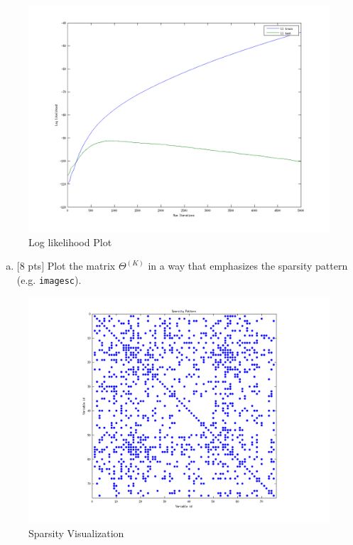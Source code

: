\documentclass[12pt]{article}
\begin{document}
\begin{figure}[h!]
  \centering
    \includegraphics[width=\textwidth]{ll}
  \caption{Log likelihood Plot}
\end{figure}

\begin{enumerate}[(e)]
\item $[$8 pts$]$  Plot the matrix $\Theta^{(K)}$ in a way that emphasizes the sparsity pattern (e.g. \texttt{imagesc}).
\end{enumerate}


\begin{figure}[h!]
  \centering
    \includegraphics[width=\textwidth]{sp}
  \caption{Sparsity Visualization}
\end{figure}
\end{document}
